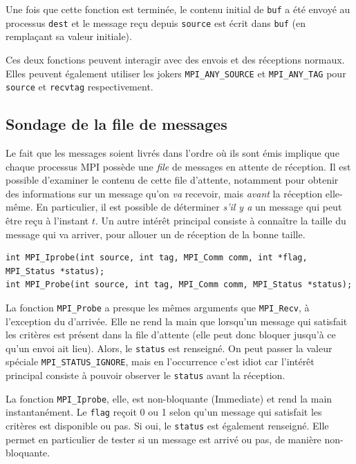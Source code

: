 Une fois que cette fonction est terminée, le contenu initial de \verb|buf| a été
envoyé au processus \verb|dest| et le message reçu depuis \verb|source| est
écrit dans \verb|buf| (en remplaçant sa valeur initiale).

Ces deux fonctions peuvent interagir avec des envois et des réceptions
normaux. Elles peuvent également utiliser les \og jokers\fg
\verb|MPI_ANY_SOURCE| et \verb|MPI_ANY_TAG| pour \verb|source| et \verb|recvtag|
respectivement.

\subsection{Sondage de la file de messages}

Le fait que les messages soient livrés dans l'ordre où ils sont émis implique
que chaque processus MPI possède une \emph{file} de messages en attente de
réception. Il est possible d'examiner le contenu de cette file d'attente,
notamment pour obtenir des informations sur un message qu'on \emph{va} recevoir,
mais \emph{avant} la réception elle-même. En particulier, il est possible de
déterminer \emph{s'il y a} un message qui peut être reçu à l'instant $t$. Un
autre intérêt principal consiste à connaître la taille du message qui va
arriver, pour allouer un  de réception de la bonne taille.

\begin{verbatim}
int MPI_Iprobe(int source, int tag, MPI_Comm comm, int *flag, MPI_Status *status);
int MPI_Probe(int source, int tag, MPI_Comm comm, MPI_Status *status);
\end{verbatim}

La fonction \verb|MPI_Probe| a presque les mêmes arguments que \verb|MPI_Recv|,
à l'exception du  d'arrivée. Elle ne rend la main que lorsqu'un
message qui satisfait les critères est présent dans la file d'attente (elle peut
donc bloquer jusqu'à ce qu'un envoi ait lieu). Alors, le \verb|status| est
renseigné. On peut passer la valeur spéciale \verb|MPI_STATUS_IGNORE|, mais en
l'occurrence c'est idiot car l'intérêt principal consiste à pouvoir observer le
\verb|status| avant la réception.

La fonction \verb|MPI_Iprobe|, elle, est non-bloquante (\og Immediate\fg) et
rend la main instantanément. Le \verb|flag| reçoit 0 ou 1 selon qu'un message
qui satisfait les critères est disponible ou pas. Si oui, le \verb|status| est
également renseigné. Elle permet en particulier de tester si un message est
arrivé ou pas, de manière non-bloquante.

